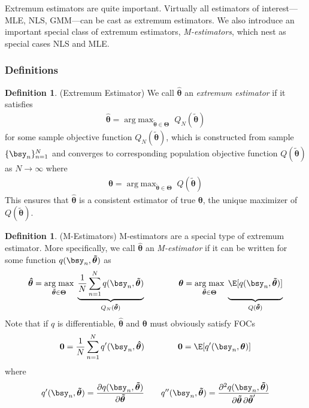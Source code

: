 \documentclass[12pt]{article}
\theoremstyle{plain}
\theoremstyle{definition}
\newtheorem{defn}[thm]{Definition}
\theoremstyle{remark}
\newcommand{\ra}{\rightarrow}
\newcommand{\bstheta}{\boldsymbol{\theta}}
\newcommand{\bsTheta}{\boldsymbol{\Theta}}
\newcommand{\bshattheta}{\boldsymbol{\hat{\theta}}}
\newcommand{\bstildetheta}{\boldsymbol{\tilde{\theta}}}
\renewcommand{\bso}{\boldsymbol{0}}
\DeclareMathOperator*{\argmax}{arg\;max}
\newcommand{\sumnN}{\sum^N_{n=1}}
\newcommand{\nN}{_{n=1}^N}
\begin{document}
Extremum estimators are quite important. Virtually all estimators of
interest---MLE, NLS, GMM---can be cast as extremum estimators. We also
introduce an important special class of extremum estimators,
\emph{M-estimators}, which nest as special cases NLS and MLE.

\subsubsection{Definitions}

\begin{defn}(Extremum Estimator)
We call $\bshattheta$ an \emph{extremum estimator} if it satisfies
\begin{align*}
  \bshattheta = \argmax_{\bstildetheta\in\bsTheta}\;
  Q_N(\bstildetheta)
\end{align*}
for some sample objective function $Q_N(\bstildetheta)$, which is
constructed from sample $\{\bsy_n\}\nN$ and converges to corresponding
population objective function $Q(\bstildetheta)$ as $N\ra\infty$ where
\begin{align*}
  \bstheta = \argmax_{\bstildetheta\in\bsTheta}\;
  Q(\bstildetheta)
\end{align*}
This ensures that $\bshattheta$ is a consistent estimator of true
$\bstheta$, the unique maximizer of $Q(\bstildetheta)$.
\end{defn}

\begin{defn}(M-Estimators)
M-estimators are a special type of extremum estimator. More
specifically, we call $\bshattheta$ an \emph{M-estimator} if it can be
written for some function $q(\bsy_n,\bstildetheta)$ as
\begin{align*}
  \bshattheta =
  \argmax_{\bstildetheta\in\bsTheta}\;
  \underbrace{%
  \frac{1}{N}
  \sumnN q(\bsy_n,\bstildetheta)
  }_{Q_N(\bstildetheta)}
  \qquad\qquad
  \bstheta =
  \argmax_{\bstildetheta\in\bsTheta}\;
  \underbrace{%
    \E[q(\bsy_n,\bstildetheta)]
    \vphantom{%
      \sumnN q(\bsy_n,\bstildetheta)
    }
  }_{Q(\bstildetheta)}
\end{align*}
Note that if $q$ is differentiable, $\bshattheta$ and $\bstheta$
must obviously satisfy FOCs
\begin{align}
  \bso
  = \frac{1}{N}\sumnN q'(\bsy_n, \bshattheta)
  \qquad\qquad
  \bso
  = \E[q'(\bsy_n,\bstheta)]
  \label{mestobj}
\end{align}
where
\begin{align*}
  q'(\bsy_n,\bstildetheta)
  =
  \frac{\partial q(\bsy_n,\bstildetheta)}{%
    \partial\bstildetheta}
  \qquad
  q''(\bsy_n,\bstildetheta)
  =
  \frac{\partial^2 q(\bsy_n,\bstildetheta)}{%
    \partial\bstildetheta\,\partial\bstildetheta'}
\end{align*}
\end{defn}
\end{document}
